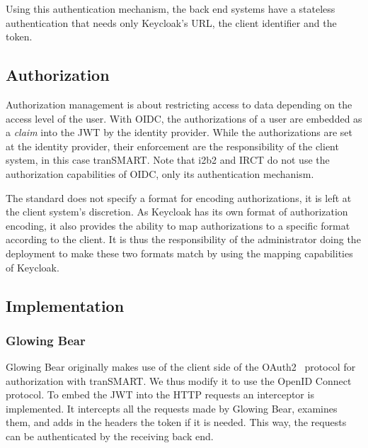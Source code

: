 Using this authentication mechanism, the back end systems have a stateless authentication that needs only Keycloak's URL, the client identifier and the token.



\subsection{Authorization}

Authorization management is about restricting access to data depending on the access level of the user.
With OIDC, the authorizations of a user are embedded as a \emph{claim} into the JWT by the identity provider.
While the authorizations are set at the identity provider, their enforcement are the responsibility of the client system, in this case tranSMART. 
Note that i2b2 and IRCT do not use the authorization capabilities of OIDC, only its authentication mechanism.

The standard does not specify a format for encoding authorizations, it is left at the client system's discretion.
As Keycloak has its own format of authorization encoding, it also provides the ability to map authorizations to a specific format according to the client.
It is thus the responsibility of the administrator doing the deployment to make these two formats match by using the mapping capabilities of Keycloak.


\subsection{Implementation}

\subsubsection{Glowing Bear}

Glowing Bear originally makes use of the client side of the OAuth2~\cite{rfc:oauth2} protocol for authorization with tranSMART. 
We thus modify it to use the OpenID Connect protocol.
To embed the JWT into the HTTP requests an interceptor is implemented. 
It intercepts all the requests made by Glowing Bear, examines them, and adds in the headers the token if it is needed.
This way, the requests can be authenticated by the receiving back end.

